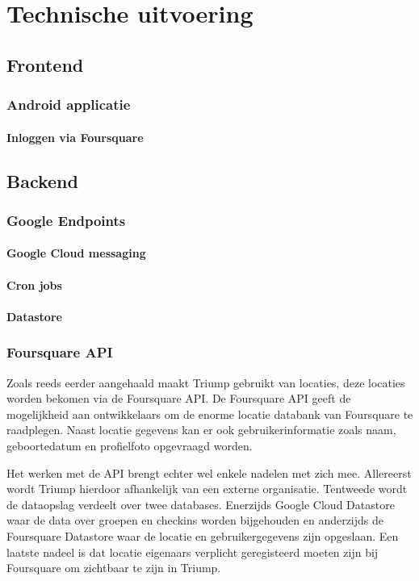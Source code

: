 
\chapter{Technische uitvoering}



\section{Frontend}
\subsection{Android applicatie}
\subsubsection{Inloggen via Foursquare}
\section{Backend}
\subsection{Google Endpoints}
\subsubsection{Google Cloud messaging}
\subsubsection{Cron jobs}
\subsubsection{Datastore}
\subsection{Foursquare API}

Zoals reeds eerder aangehaald maakt Triump gebruikt van locaties, deze locaties worden bekomen via de Foursquare API. De Foursquare API geeft de mogelijkheid aan ontwikkelaars om de enorme locatie databank van Foursquare te raadplegen. Naast locatie gegevens kan er ook gebruikerinformatie zoals naam, geboortedatum en profielfoto opgevraagd worden.

Het werken met de API brengt echter wel enkele nadelen met zich mee.
Allereerst wordt Triump hierdoor afhankelijk van een externe organisatie. Tentweede wordt de dataopslag verdeelt over twee databases. Enerzijds Google Cloud Datastore waar de data over groepen en checkins worden bijgehouden en anderzijds de Foursquare Datastore waar de locatie en gebruikergegevens zijn opgeslaan. Een laatste nadeel is dat locatie eigenaars verplicht geregisteerd moeten zijn bij Foursquare om zichtbaar te zijn in Triump. 

